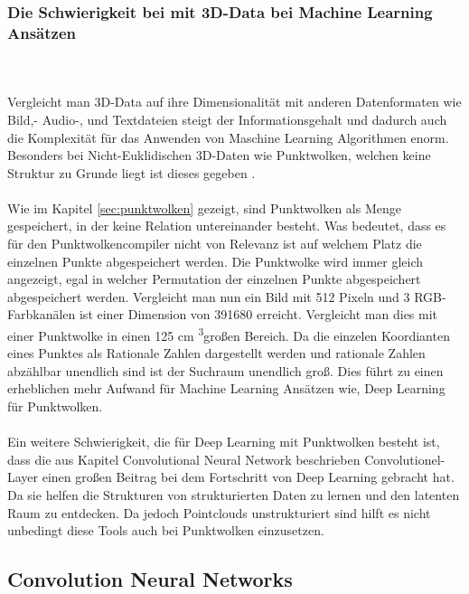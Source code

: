 \documentclass{llncs}
\begin{document}
\subsubsection{Die Schwierigkeit bei mit 3D-Data bei Machine Learning Ansätzen}\label{sec:3dprobleme}
~\\\\
Vergleicht man 3D-Data auf ihre Dimensionalität mit anderen Datenformaten wie Bild,- Audio-, und Textdateien steigt der Informationsgehalt und dadurch auch die Komplexität für das Anwenden von Maschine Learning Algorithmen enorm. Besonders bei Nicht-Euklidischen 3D-Daten wie Punktwolken, welchen keine Struktur zu Grunde liegt ist dieses gegeben \cite{3dprob}.
\\\\
Wie im Kapitel \ref{sec:punktwolken} gezeigt, sind Punktwolken als Menge gespeichert, in der keine Relation untereinander besteht. Was bedeutet, dass es für den Punktwolkencompiler nicht von Relevanz ist auf welchem Platz die einzelnen Punkte abgespeichert werden. Die Punktwolke wird immer gleich angezeigt, egal in welcher Permutation der einzelnen Punkte abgespeichert abgespeichert werden. Vergleicht man nun ein Bild mit 512 Pixeln und 3 RGB-Farbkanälen ist einer Dimension von 391680 erreicht. Vergleicht man dies mit einer Punktwolke in einen 125 cm \textsuperscript{3}großen Bereich. Da die einzelen Koordianten eines Punktes als Rationale Zahlen dargestellt werden und rationale Zahlen abzählbar unendlich sind ist der Suchraum unendlich groß. Dies führt zu einen erheblichen mehr Aufwand für Machine Learning Ansätzen wie, Deep Learning für Punktwolken.
\\\\
Ein weitere Schwierigkeit, die für Deep Learning mit Punktwolken besteht ist, dass die aus Kapitel Convolutional Neural Network beschrieben Convolutionel-Layer einen großen Beitrag bei dem Fortschritt von Deep Learning gebracht hat. Da sie helfen die Strukturen von strukturierten Daten zu lernen und den latenten Raum zu entdecken. Da jedoch Pointclouds unstrukturiert sind hilft es nicht unbedingt diese Tools auch bei Punktwolken einzusetzen\cite{3dgan}.  

\subsection{Convolution Neural Networks}
\end{document}
